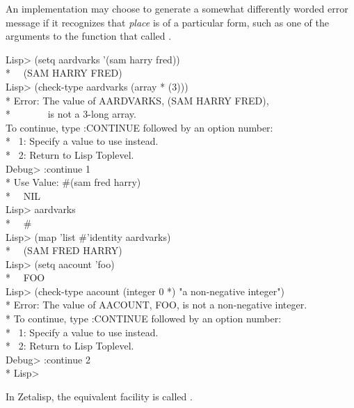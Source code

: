 \begin{defmac}
  \beforenoterule
  \begin{implementation}
  An implementation may choose to generate a somewhat
  differently worded error message if it recognizes that \emph{place} is of a
  particular form, such as one of the arguments to the function that called
  .
  \end{implementation}
\afternoterule

\begin{lisp}
Lisp> (setq aardvarks '(sam harry fred)) \\*
~\EV\ (SAM HARRY FRED) \\
Lisp> (check-type aardvarks (array * (3))) \\*
Error: The value of AARDVARKS, (SAM HARRY FRED), \\*
~~~~~~~is not a 3-long array. \\
To continue, type :CONTINUE followed by an option number: \\*
~1: Specify a value to use instead. \\*
~2: Return to Lisp Toplevel. \\
Debug> :continue 1 \\*
Use Value: \#(sam fred harry) \\*
~\EV\ NIL \\
Lisp> aardvarks \\*
~\EV\ \#<ARRAY-3 13571> \\
Lisp> (map 'list \#'identity aardvarks) \\*
~\EV\ (SAM FRED HARRY) \\
Lisp> (setq aacount 'foo) \\*
~\EV\ FOO \\
Lisp> (check-type aacount (integer 0 *) "a non-negative integer") \\*
Error: The value of AACOUNT, FOO, is not a non-negative integer. \\*
To continue, type :CONTINUE followed by an option number: \\*
~1: Specify a value to use instead. \\*
~2: Return to Lisp Toplevel. \\
Debug> :continue 2 \\*
Lisp> 
\end{lisp}

\beforenoterule
  \begin{incompatibility}
  In Zetalisp, the equivalent facility is called .
  \end{incompatibility}
\afternoterule
\end{defmac}



